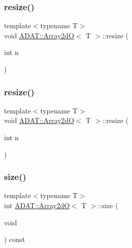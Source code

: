 \mbox{\label{classADAT_1_1Array2dO_aebe81d1fc5cdfea1b7a36effad3fb2e2}} 
\subsubsection{\texorpdfstring{resize()}{resize()}\hspace{0.1cm}{\footnotesize\ttfamily [5/6]}}
{\footnotesize\ttfamily template$<$typename T$>$ \\
void \mbox{\hyperlink{classADAT_1_1Array2dO}{A\+D\+A\+T\+::\+Array2dO}}$<$ T $>$\+::resize (\begin{DoxyParamCaption}\item[{int}]{n }\end{DoxyParamCaption})\hspace{0.3cm}{\ttfamily [inline]}}

\mbox{\label{classADAT_1_1Array2dO_aebe81d1fc5cdfea1b7a36effad3fb2e2}} 
\subsubsection{\texorpdfstring{resize()}{resize()}\hspace{0.1cm}{\footnotesize\ttfamily [6/6]}}
{\footnotesize\ttfamily template$<$typename T$>$ \\
void \mbox{\hyperlink{classADAT_1_1Array2dO}{A\+D\+A\+T\+::\+Array2dO}}$<$ T $>$\+::resize (\begin{DoxyParamCaption}\item[{int}]{n }\end{DoxyParamCaption})\hspace{0.3cm}{\ttfamily [inline]}}

\mbox{\label{classADAT_1_1Array2dO_a2f8311cdee5283e57e5d13887a463123}} 
\subsubsection{\texorpdfstring{size()}{size()}\hspace{0.1cm}{\footnotesize\ttfamily [1/3]}}
{\footnotesize\ttfamily template$<$typename T$>$ \\
int \mbox{\hyperlink{classADAT_1_1Array2dO}{A\+D\+A\+T\+::\+Array2dO}}$<$ T $>$\+::size (\begin{DoxyParamCaption}\item[{void}]{ }\end{DoxyParamCaption}) const\hspace{0.3cm}{\ttfamily [inline]}}

